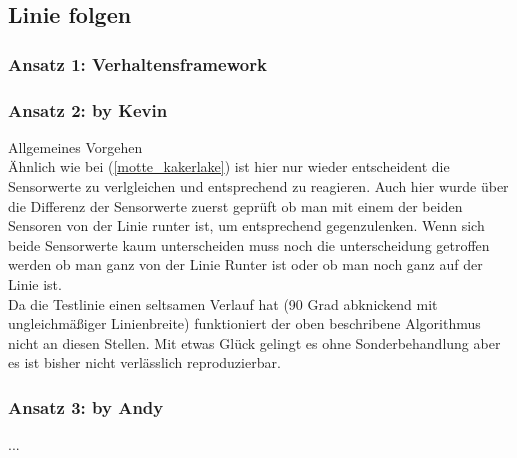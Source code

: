 \subsection{Linie folgen}
\label{linie_folgen}

\subsubsection{Ansatz 1: Verhaltensframework}

\subsubsection{Ansatz 2: by Kevin}

Allgemeines Vorgehen\\
Ähnlich wie bei  (\ref{motte_kakerlake})  ist hier nur wieder entscheident die Sensorwerte zu verlgleichen und entsprechend zu reagieren. Auch hier wurde über die Differenz der Sensorwerte zuerst geprüft ob man mit einem der beiden Sensoren von der Linie runter ist, um entsprechend gegenzulenken. Wenn sich beide Sensorwerte kaum unterscheiden muss noch die unterscheidung getroffen werden ob man ganz von der Linie Runter ist oder ob man noch ganz auf der Linie ist.
\\
Da die Testlinie einen seltsamen Verlauf hat (90 Grad abknickend mit ungleichmäßiger Linienbreite) funktioniert der oben beschribene Algorithmus nicht an diesen Stellen. Mit etwas Glück gelingt es ohne Sonderbehandlung aber es ist bisher nicht verlässlich reproduzierbar.


\subsubsection{Ansatz 3: by Andy}
...
